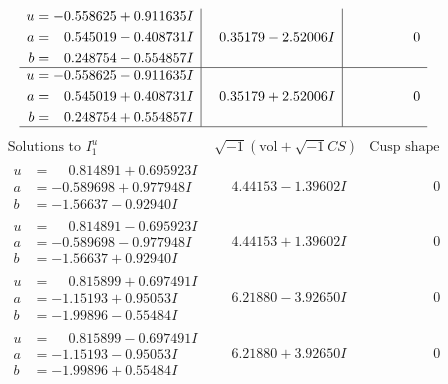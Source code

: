 \documentclass[1p]{elsarticle_modified}
\theoremstyle{definition}
\newcommand{\I}{\sqrt{-1}}
\begin{document}
$$\begin{array}{c|c|c}
\begin{aligned}
u &= -0.558625 + 0.911635 I \\
a &= \phantom{-}0.545019 - 0.408731 I \\
b &= \phantom{-}0.248754 - 0.554857 I\end{aligned}
 & \phantom{-}0.35179 - 2.52006 I & \phantom{-0.000000 } 0 \\ \hline\begin{aligned}
u &= -0.558625 - 0.911635 I \\
a &= \phantom{-}0.545019 + 0.408731 I \\
b &= \phantom{-}0.248754 + 0.554857 I\end{aligned}
 & \phantom{-}0.35179 + 2.52006 I & \phantom{-0.000000 } 0\\
 \hline 
 \end{array}$$\newpage$$\begin{array}{c|c|c}  
\text{Solutions to }I^u_{1}& \I (\text{vol} + \sqrt{-1}CS) & \text{Cusp shape}\\
 \hline 
\begin{aligned}
u &= \phantom{-}0.814891 + 0.695923 I \\
a &= -0.589698 + 0.977948 I \\
b &= -1.56637 - 0.92940 I\end{aligned}
 & \phantom{-}4.44153 - 1.39602 I & \phantom{-0.000000 } 0 \\ \hline\begin{aligned}
u &= \phantom{-}0.814891 - 0.695923 I \\
a &= -0.589698 - 0.977948 I \\
b &= -1.56637 + 0.92940 I\end{aligned}
 & \phantom{-}4.44153 + 1.39602 I & \phantom{-0.000000 } 0 \\ \hline\begin{aligned}
u &= \phantom{-}0.815899 + 0.697491 I \\
a &= -1.15193 + 0.95053 I \\
b &= -1.99896 - 0.55484 I\end{aligned}
 & \phantom{-}6.21880 - 3.92650 I & \phantom{-0.000000 } 0 \\ \hline\begin{aligned}
u &= \phantom{-}0.815899 - 0.697491 I \\
a &= -1.15193 - 0.95053 I \\
b &= -1.99896 + 0.55484 I\end{aligned}
 & \phantom{-}6.21880 + 3.92650 I & \phantom{-0.000000 } 0 \\ \hline\begin{aligned}

\end{aligned}
\end{array}$$
\end{document}
